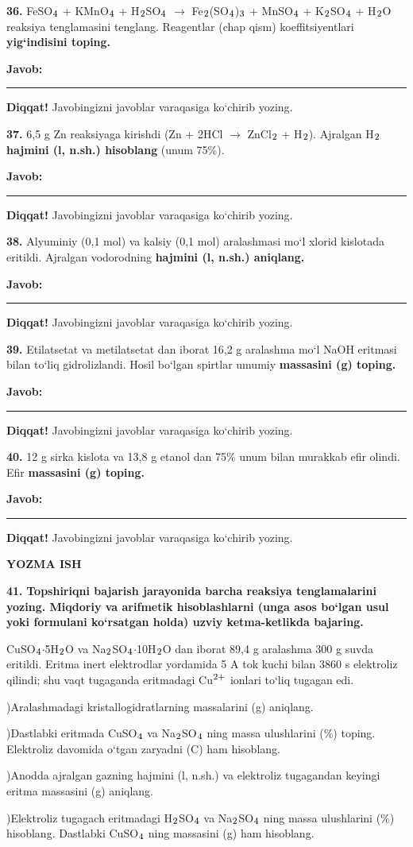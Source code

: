 \documentclass[11pt,a4paper]{article}
\renewcommand{\textsubscript}[1]{\ensuremath{_{\text{\fontsize{8}{8}\selectfont #1}}}}
\renewcommand{\textsuperscript}[1]{\ensuremath{^{\text{\fontsize{8}{8}\selectfont #1}}}}
\newcommand{\javob}{\par\smallskip\noindent\textbf{Javob:} \rule[-2pt]{7.5cm}{0.4pt}\par\smallskip\noindent\textbf{Diqqat!} Javobingizni javoblar varaqasiga ko`chirib yozing.\par\medskip}
\begin{document}
\par\bigskip
\noindent\textbf{36.} FeSO\textsubscript{4} + KMnO\textsubscript{4} + H\textsubscript{2}SO\textsubscript{4} $\to$ Fe\textsubscript{2}(SO\textsubscript{4})\textsubscript{3} + MnSO\textsubscript{4} + K\textsubscript{2}SO\textsubscript{4} + H\textsubscript{2}O reaksiya tenglamasini tenglang. Reagentlar (chap qism) koeffitsiyentlari \textbf{yig`indisini toping.}
\javob
\noindent\textbf{37.} 6,5 g Zn reaksiyaga kirishdi (Zn + 2HCl $\to$ ZnCl\textsubscript{2} + H\textsubscript{2}). Ajralgan H\textsubscript{2} \textbf{hajmini (l, n.sh.) hisoblang} (unum 75\%).
\javob
\noindent\textbf{38.} Alyuminiy (0,1 mol) va kalsiy (0,1 mol) aralashmasi mo`l xlorid kislotada eritildi. Ajralgan vodorodning \textbf{hajmini (l, n.sh.) aniqlang.}
\javob
\noindent\textbf{39.} Etilatsetat va metilatsetat dan iborat 16,2 g aralashma mo`l NaOH eritmasi bilan to`liq gidrolizlandi. Hosil bo`lgan spirtlar umumiy \textbf{massasini (g) toping.}
\javob
\noindent\textbf{40.} 12 g sirka kislota va 13,8 g etanol dan 75\% unum bilan murakkab efir olindi. Efir \textbf{massasini (g) toping.}
\javob
\par\bigskip\begin{center}\textbf{\fontsize{13}{15}\selectfont YOZMA ISH}\end{center}
\noindent\textbf{41.} \textbf{Topshiriqni bajarish jarayonida barcha reaksiya tenglamalarini yozing. Miqdoriy va arifmetik hisoblashlarni (unga asos bo`lgan usul yoki formulani ko`rsatgan holda) uzviy ketma-ketlikda bajaring.}\par\smallskip
CuSO\textsubscript{4}$\cdot$5H\textsubscript{2}O va Na\textsubscript{2}SO\textsubscript{4}$\cdot$10H\textsubscript{2}O dan iborat 89,4 g aralashma 300 g suvda eritildi. Eritma inert elektrodlar yordamida 5 A tok kuchi bilan 3860 s elektroliz qilindi; shu vaqt tugaganda eritmadagi Cu\textsuperscript{2+} ionlari to`liq tugagan edi.\par
{})Aralashmadagi kristallogidratlarning massalarini (g) aniqlang.\par
{})Dastlabki eritmada CuSO\textsubscript{4} va Na\textsubscript{2}SO\textsubscript{4} ning massa ulushlarini (\%) toping. Elektroliz davomida o`tgan zaryadni (C) ham hisoblang.\par
{})Anodda ajralgan gazning hajmini (l, n.sh.) va elektroliz tugagandan keyingi eritma massasini (g) aniqlang.\par
{})Elektroliz tugagach eritmadagi H\textsubscript{2}SO\textsubscript{4} va Na\textsubscript{2}SO\textsubscript{4} ning massa ulushlarini (\%) hisoblang. Dastlabki CuSO\textsubscript{4} ning massasini (g) ham hisoblang.\par
\end{document}
